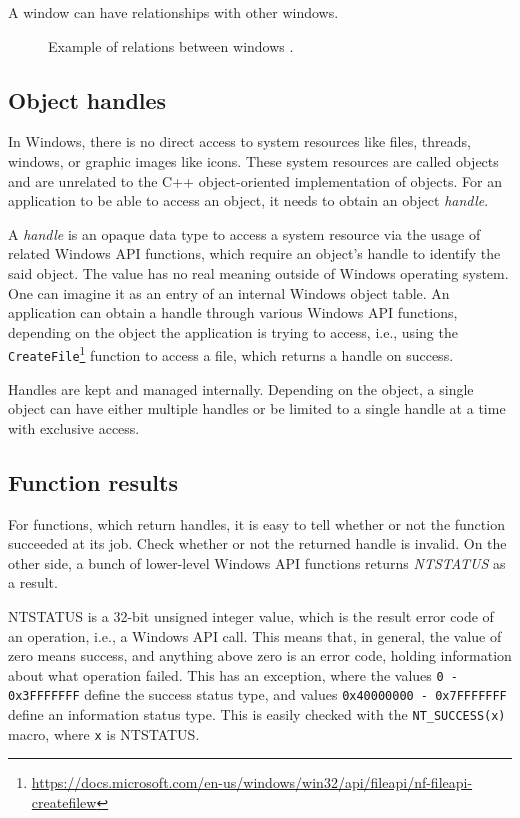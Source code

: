 A window can have relationships with other windows.\cite{WinWindow}
\begin{figure}[htbp]
	\centering
	\caption{Example of relations between windows .}
	\label{windowsExample}
\end{figure}

\subsection*{Object handles}
\label{ch2handle}
In Windows, there is no direct access to system resources like files, threads, windows, or graphic images like icons. These system resources are called objects and are unrelated to the C++ object-oriented implementation of objects. For an application to be able to access an object, it needs to obtain an object \textit{handle}.

A \textit{handle} is an opaque data type to access a system resource via the usage of related Windows API functions, which require an object's handle to identify the said object. The value has no real meaning outside of Windows operating system. One can imagine it as an entry of an internal Windows object table. An application can obtain a handle through various Windows API functions, depending on the object the application is trying to access, i.e., using the \lstinline{CreateFile}\footnote{\url{https://docs.microsoft.com/en-us/windows/win32/api/fileapi/nf-fileapi-createfilew}} function to access a file, which returns a handle on success.\cite{HandlesAndObjects}

Handles are kept and managed internally. Depending on the object, a single object can have either multiple handles or be limited to a single handle at a time with exclusive access.\cite{WinHandleLimits}

\subsection*{Function results}
For functions, which return handles, it is easy to tell whether or not the function succeeded at its job. Check whether or not the returned handle is invalid. On the other side, a bunch of lower-level Windows API functions returns \textit{NTSTATUS} as a result.

NTSTATUS is a 32-bit unsigned integer value, which is the result error code of an operation, i.e., a Windows API call. This means that, in general, the value of zero means success, and anything above zero is an error code, holding information about what operation failed. This has an exception, where the values \lstinline{0 - 0x3FFFFFFF} define the success status type, and values 
\lstinline{0x40000000 - 0x7FFFFFFF} define an information status type. This is easily checked with the \lstinline{NT_SUCCESS(x)} macro, where \lstinline{x} is NTSTATUS.\cite{WinNTSTATUS}\cite{WinNTSuccess}

